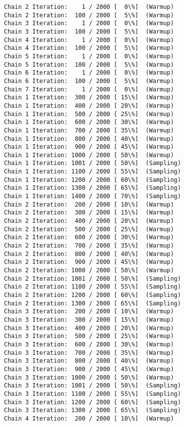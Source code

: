 \documentclass[11pt]{article}
\begin{document}
    \begin{Verbatim}[commandchars=\\\{\}]
Chain 2 Iteration:    1 / 2000 [  0\%]  (Warmup)
Chain 2 Iteration:  100 / 2000 [  5\%]  (Warmup)
Chain 3 Iteration:    1 / 2000 [  0\%]  (Warmup)
Chain 3 Iteration:  100 / 2000 [  5\%]  (Warmup)
Chain 4 Iteration:    1 / 2000 [  0\%]  (Warmup)
Chain 4 Iteration:  100 / 2000 [  5\%]  (Warmup)
Chain 5 Iteration:    1 / 2000 [  0\%]  (Warmup)
Chain 5 Iteration:  100 / 2000 [  5\%]  (Warmup)
Chain 6 Iteration:    1 / 2000 [  0\%]  (Warmup)
Chain 6 Iteration:  100 / 2000 [  5\%]  (Warmup)
Chain 7 Iteration:    1 / 2000 [  0\%]  (Warmup)
Chain 1 Iteration:  300 / 2000 [ 15\%]  (Warmup)
Chain 1 Iteration:  400 / 2000 [ 20\%]  (Warmup)
Chain 1 Iteration:  500 / 2000 [ 25\%]  (Warmup)
Chain 1 Iteration:  600 / 2000 [ 30\%]  (Warmup)
Chain 1 Iteration:  700 / 2000 [ 35\%]  (Warmup)
Chain 1 Iteration:  800 / 2000 [ 40\%]  (Warmup)
Chain 1 Iteration:  900 / 2000 [ 45\%]  (Warmup)
Chain 1 Iteration: 1000 / 2000 [ 50\%]  (Warmup)
Chain 1 Iteration: 1001 / 2000 [ 50\%]  (Sampling)
Chain 1 Iteration: 1100 / 2000 [ 55\%]  (Sampling)
Chain 1 Iteration: 1200 / 2000 [ 60\%]  (Sampling)
Chain 1 Iteration: 1300 / 2000 [ 65\%]  (Sampling)
Chain 1 Iteration: 1400 / 2000 [ 70\%]  (Sampling)
Chain 2 Iteration:  200 / 2000 [ 10\%]  (Warmup)
Chain 2 Iteration:  300 / 2000 [ 15\%]  (Warmup)
Chain 2 Iteration:  400 / 2000 [ 20\%]  (Warmup)
Chain 2 Iteration:  500 / 2000 [ 25\%]  (Warmup)
Chain 2 Iteration:  600 / 2000 [ 30\%]  (Warmup)
Chain 2 Iteration:  700 / 2000 [ 35\%]  (Warmup)
Chain 2 Iteration:  800 / 2000 [ 40\%]  (Warmup)
Chain 2 Iteration:  900 / 2000 [ 45\%]  (Warmup)
Chain 2 Iteration: 1000 / 2000 [ 50\%]  (Warmup)
Chain 2 Iteration: 1001 / 2000 [ 50\%]  (Sampling)
Chain 2 Iteration: 1100 / 2000 [ 55\%]  (Sampling)
Chain 2 Iteration: 1200 / 2000 [ 60\%]  (Sampling)
Chain 2 Iteration: 1300 / 2000 [ 65\%]  (Sampling)
Chain 3 Iteration:  200 / 2000 [ 10\%]  (Warmup)
Chain 3 Iteration:  300 / 2000 [ 15\%]  (Warmup)
Chain 3 Iteration:  400 / 2000 [ 20\%]  (Warmup)
Chain 3 Iteration:  500 / 2000 [ 25\%]  (Warmup)
Chain 3 Iteration:  600 / 2000 [ 30\%]  (Warmup)
Chain 3 Iteration:  700 / 2000 [ 35\%]  (Warmup)
Chain 3 Iteration:  800 / 2000 [ 40\%]  (Warmup)
Chain 3 Iteration:  900 / 2000 [ 45\%]  (Warmup)
Chain 3 Iteration: 1000 / 2000 [ 50\%]  (Warmup)
Chain 3 Iteration: 1001 / 2000 [ 50\%]  (Sampling)
Chain 3 Iteration: 1100 / 2000 [ 55\%]  (Sampling)
Chain 3 Iteration: 1200 / 2000 [ 60\%]  (Sampling)
Chain 3 Iteration: 1300 / 2000 [ 65\%]  (Sampling)
Chain 4 Iteration:  200 / 2000 [ 10\%]  (Warmup)

\end{Verbatim}
\end{document}
